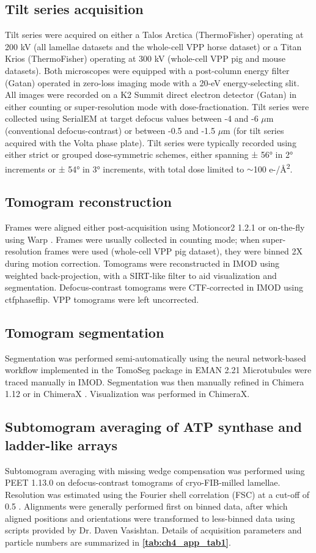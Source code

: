 \subsection*{Tilt series acquisition}
Tilt series were acquired on either a Talos Arctica (ThermoFisher) operating at 200 kV (all lamellae datasets and the whole-cell VPP horse dataset) or a Titan Krios (ThermoFisher) operating at 300 kV (whole-cell VPP pig and mouse datasets). Both microscopes were equipped with a post-column energy filter (Gatan) operated in zero-loss imaging mode with a 20-eV energy-selecting slit. All images were recorded on a K2 Summit direct electron detector (Gatan) in either counting or super-resolution mode with dose-fractionation. Tilt series were collected using SerialEM \cite{Mastronarde2005} at target defocus values between -4 and -6 $\mu$m (conventional defocus-contrast) or between -0.5 and -1.5 $\mu$m (for tilt series acquired with the Volta phase plate). Tilt series were typically recorded using either strict or grouped dose-symmetric schemes, either spanning ± 56° in 2° increments or ± 54° in 3° increments, with total dose limited to $\sim$100 e-/Å\textsuperscript{2}.
%
\subsection*{Tomogram reconstruction}
Frames were aligned either post-acquisition using Motioncor2 1.2.1 \cite{Zheng2017} or on-the-fly using Warp \cite{Tegunov2019}. Frames were usually collected in counting mode; when super-resolution frames were used (whole-cell VPP pig dataset), they were binned 2X during motion correction. Tomograms were reconstructed in IMOD \cite{Kremer1996} using weighted back-projection, with a SIRT-like filter \cite{Zeng2012} to aid visualization and segmentation. Defocus-contrast tomograms were CTF-corrected in IMOD using ctfphaseflip. VPP tomograms were left uncorrected.
%
\subsection*{Tomogram segmentation}
Segmentation was performed semi-automatically using the neural network-based workflow implemented in the TomoSeg package in EMAN 2.21 \cite{Chen2017b} Microtubules were traced manually in IMOD. Segmentation was then manually refined in Chimera 1.12 \cite{Pettersen2004} or in ChimeraX \cite{Goddard2018}. Visualization was performed in ChimeraX.
%
\subsection*{Subtomogram averaging of ATP synthase and ladder-like arrays}
Subtomogram averaging with missing wedge compensation was performed using PEET 1.13.0 \cite{Heumann2011, Nicastro2006} on defocus-contrast tomograms of cryo-FIB-milled lamellae. Resolution was estimated using the Fourier shell correlation (FSC) at a cut-off of 0.5 \cite{Nicastro2006}. Alignments were generally performed first on binned data, after which aligned positions and orientations were transformed to less-binned data using scripts provided by Dr. Daven Vasishtan. Details of acquisition parameters and particle numbers are summarized in \textbf{\autoref{tab:ch4_app_tab1}}.

